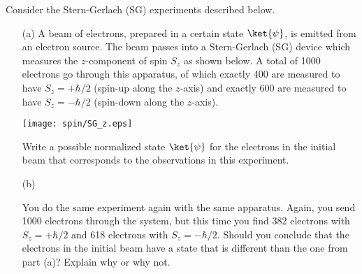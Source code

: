 \begin{problem}
Consider the Stern-Gerlach (SG) experiments described below.
\begin{itemize}
\item[(a)] A beam of electrons, prepared in a certain state $\ket{\psi}$,
is emitted from an electron source. The beam passes into a Stern-Gerlach (SG)
device which measures the $z$-component of spin $S_z$ as shown below. 
A total of 1000 electrons go through this apparatus, of which 
exactly 400 are measured to have $S_z=+\hbar/2$ 
(spin-up along the $z$-axis) and exactly 600 are measured to have 
$S_z=-\hbar/2$ (spin-down along the $z$-axis). 
\begin{center}
\texttt{[image: spin/SG\_z.eps]}   
\end{center}
Write a possible normalized state $\ket{\psi}$ for the electrons in 
the initial beam that corresponds to the observations in this experiment.

\item[(b)] 

You do the same experiment again with the same apparatus.  Again, you 
send 1000 electrons through the system, but this time you find 
382 electrons with $S_z = +\hbar/2$ and 618 electrons with $S_z = -\hbar/2$.
Should you conclude that the electrons in the initial beam have a
state that is different than the one from part (a)? Explain why or why not.

\end{itemize}

\end{problem}
